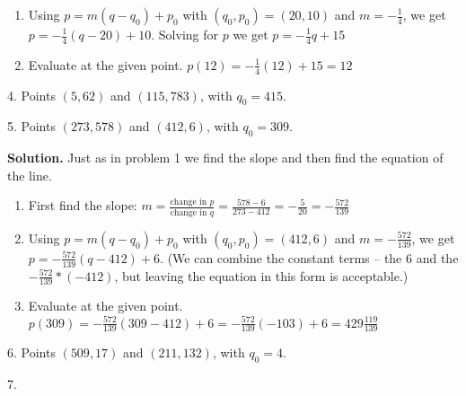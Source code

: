 \documentclass[10pt,]{book}
\theoremstyle{plain}
\theoremstyle{definition}
\begin{document}
\begin{exerciselist}
\begin{enumerate}[label=(\alph*)]
=  =-=-\)%
\item\hypertarget{li-10}{}Using \(p=m (q-q_0)+p_0\) with \((q_0,p_0 )=(20, 10)\) and \(m = -\frac{1}{4}\), we get \(p=-\frac{1}{4}(q-20)+10\).  Solving for \(p\) we get \(p =-\frac{1}{4}q+15\)%
\item\hypertarget{li-11}{}Evaluate at the given point.  \(p(12)=-\frac{1}{4}(12)+15=12\)%
\end{enumerate}
\item[4.]\hypertarget{exercise-4}{} Points \((5,62)\) and \((115,783)\), with \(q_0=415\).
%
\par\smallskip
\item[5.]\hypertarget{exercise-5}{} Points \((273,578)\) and \((412,6)\), with \(q_0=309\).
%
\par\smallskip
\par\smallskip
\noindent\textbf{Solution.}\hypertarget{solution-3}{}\quad
Just as in problem 1 we find the slope and then find the equation of the line.%
\leavevmode%
\begin{enumerate}[label=(\alph*)]
\item\hypertarget{li-12}{}First find the slope: \(m=  \frac{\text{change in }p}{\text{change in }q}
=  \frac{578-6}{273-412}=-\frac{5}{20}=-\frac{572}{139}\)%
\item\hypertarget{li-13}{}Using \(p=m (q-q_0)+p_0\) with \((q_0,p_0 )=(412, 6)\) and \(m = -\frac{572}{139}\), we get \(p=-\frac{572}{139}(q-412)+6\).  (We can combine the constant terms – the \(6\) and the \(-\frac{572}{139}*(-412)\), but leaving the equation in this form is acceptable.)%
\item\hypertarget{li-14}{}Evaluate at the given point.  \(p(309)=-\frac{572}{139}(309-412)+6
=-\frac{572}{139}(-103)+6=429\frac{119}{139}\)%
\end{enumerate}
\item[6.]\hypertarget{exercise-6}{} Points \((509,17)\) and \((211,132)\), with \(q_0=4\).
%
\par\smallskip
\item[7.]\hypertarget{exercise-7}{}\par\smallskip
\end{exerciselist}
\typeout{************************************************}
\typeout{************************************************}
\end{document}
